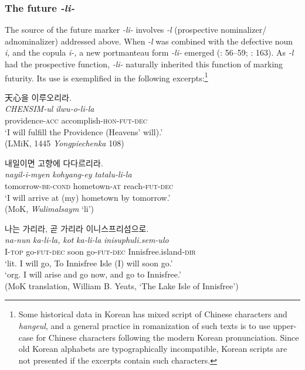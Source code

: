 \documentclass[output=paper,colorlinks,citecolor=brown]{langscibook}
\begin{document}
\largerpage[-0.5]

\subsubsection{The future \textit{-li-}}\label{sec:2.1.2}
The source of the future marker \textit{-li-} involves \textit{-l} (prospective nominalizer/ adnominalizer) addressed above. When \textit{-l} was combined with the defective noun \textit{i,} and the copula \textit{i-,} a new portmanteau form \textit{-li-} emerged (\cite{Lee1997}: 56--59; \cite{Park1998}: 163). As \textit{-l} had the prospective function, \textit{-li-} naturally inherited this function of marking futurity. Its use is exemplified in the following excerpts:\footnote{Some historical data in Korean has mixed script of Chinese characters and \textit{hangeul}, and a general practice in romanization of such texts is to use upper-case for Chinese characters following the modern Korean pronunciation. Since old Korean alphabets are typographically incompatible, Korean scripts are not presented if the excerpts contain such characters.}

\ea \label{ex:rhee:3}

    \ea \label{ex:rhee:3a}\textkorean{天心을 이루오리라}.\\
    \gll \textit{CHENSIM-ul} \textit{ilwu-o-li-la}\\
         providence-\textsc{acc} accomplish-\textsc{hon-fut-dec}\\
    \glt `I will fulfill the Providence (Heavens’ will).'\\
    \hfill (LMiK, 1445 \textit{Yongpiechenka} 108)


    \ex \label{ex:rhee:3b}\textkorean{내일이면 고향에 다다르리라}.\\
    \gll \textit{nayil-i-myen} \textit{kohyang-ey} \textit{tatalu-li-la}\\
         tomorrow-\textsc{be-cond} hometown-\textsc{at} reach-\textsc{fut-dec}\\
    \glt `I will arrive at (my) hometown by tomorrow.'\\
    \hfill (MoK, \textit{Wulimalsaym} ‘li’)


    \ex \label{ex:rhee:3c}\textkorean{나는 가리라, 곧 가리라 이니스프리섬으로}.\\
    \gll \textit{na-nun} \textit{ka-li-la,} \textit{kot} \textit{ka-li-la} \textit{inisuphuli.sem-ulo}\\
         I-\textsc{top} go-\textsc{fut-dec} soon go-\textsc{fut-dec} Innisfree.island-\textsc{dir}\\
    \glt `lit. I will go, To Innisfree Isle (I) will soon go.'\\
    \glt `org. I will arise and go now, and go to Innisfree.'\\
    \hfill (MoK translation, William B. Yeats, ‘The Lake Isle of Innisfree’)
    \z
\end{document}

